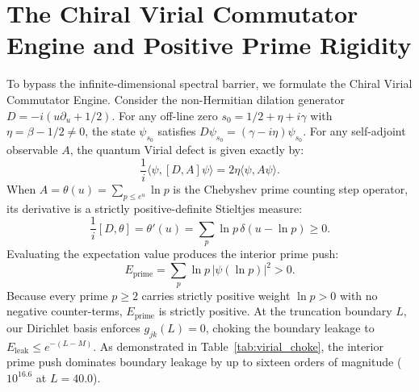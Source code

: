 \documentclass[11pt,a4paper]{article}
\begin{document}
\section{The Chiral Virial Commutator Engine and Positive Prime Rigidity}
To bypass the infinite-dimensional spectral barrier, we formulate the Chiral Virial Commutator Engine. Consider the non-Hermitian dilation generator $D = -i(u \partial_u + 1/2)$. For any off-line zero $s_0 = 1/2 + \eta + i\gamma$ with $\eta = \beta - 1/2 \ne 0$, the state $\psi_{s_0}$ satisfies $D \psi_{s_0} = (\gamma - i\eta) \psi_{s_0}$. For any self-adjoint observable $A$, the quantum Virial defect is given exactly by:
\begin{equation}
\frac{1}{i} \langle \psi, [D, A] \psi \rangle = 2\eta \langle \psi, A \psi \rangle.
\end{equation}
When $A = \theta(u) = \sum_{p \le e^u} \ln p$ is the Chebyshev prime counting step operator, its derivative is a strictly positive-definite Stieltjes measure:
\begin{equation}
\frac{1}{i} [D, \theta] = \theta'(u) = \sum_p \ln p \, \delta(u - \ln p) \ge 0.
\end{equation}
Evaluating the expectation value produces the interior prime push:
\begin{equation}
E_{\mathrm{prime}} = \sum_p \ln p \, |\psi(\ln p)|^2 > 0.
\end{equation}
Because every prime $p \ge 2$ carries strictly positive weight $\ln p > 0$ with no negative counter-terms, $E_{\mathrm{prime}}$ is strictly positive. At the truncation boundary $L$, our Dirichlet basis enforces $g_{jk}(L) = 0$, choking the boundary leakage to $E_{\mathrm{leak}} \le e^{-(L-M)}$. As demonstrated in Table~\ref{tab:virial_choke}, the interior prime push dominates boundary leakage by up to sixteen orders of magnitude ($10^{16.6}$ at $L = 40.0$).
\end{document}
